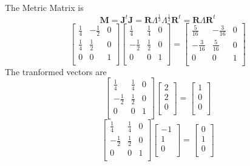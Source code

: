 \documentclass{article}
\begin{document}
The Metric Matrix is 
\begin{equation}
 \mathbf{M}=
  \mathbf{J}^t\mathbf{J}=
  \mathbf{R}\Lambda^\frac{1}{2}\Lambda^\frac{1}{2}\mathbf{R}^t=
  \mathbf{R}\Lambda\mathbf{R}^t
\end{equation}
\begin{equation}
 \left[\begin{array}{ccc}
   \frac{1}{4}&-\frac{1}{2}&0\\
   \frac{1}{4}&\frac{1}{2}&0\\
   0&0&1\\
 \end{array}\right]
 \left[\begin{array}{ccc}
   \frac{1}{4}&\frac{1}{4}&0\\
   -\frac{1}{2}&\frac{1}{2}&0\\
   0&0&1\\
 \end{array}\right]
 =  
  \left[\begin{array}{ccc}
   \frac{5}{16}&-\frac{3}{16}&0\\
   -\frac{3}{16}&\frac{5}{16}&0\\
   0&0&1\\
 \end{array}\right]
\end{equation}
The tranformed vectors are
\begin{equation}
 \left[
 \begin{array}{ccc}
   \frac{1}{4}&\frac{1}{4}&0\\
   -\frac{1}{2}&\frac{1}{2}&0\\
   0&0&1\\
 \end{array}\right]
 \left[
 \begin{array}{c}
   2\\
   2\\
   0\\
 \end{array}\right]
 =\left[
 \begin{array}{c}
   1\\
   0\\
   0\\
 \end{array}\right]
\end{equation}
\begin{equation}
 \left[
 \begin{array}{ccc}
   \frac{1}{4}&\frac{1}{4}&0\\
   -\frac{1}{2}&\frac{1}{2}&0\\
   0&0&1\\
 \end{array}\right]
 \left[
 \begin{array}{c}
   -1\\
   1\\
   0\\
 \end{array}\right]
 =\left[
 \begin{array}{c}
   0\\
   1\\
   0\\
 \end{array}\right]
\end{equation}
\end{document}
